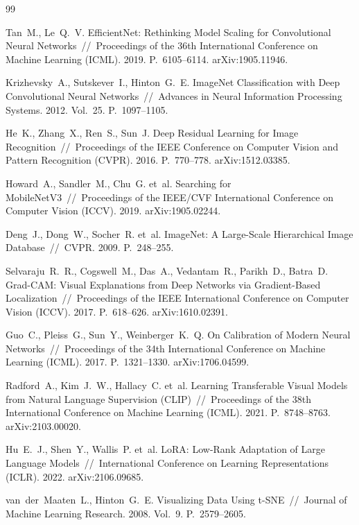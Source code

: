 \documentclass[a4paper,12pt]{diplom}
\begin{document}
\renewcommand{\bibname}{Список литературы}
\begin{thebibliography}{99}

Tan~M., Le~Q.~V. EfficientNet: Rethinking Model Scaling for Convolutional Neural Networks~//~Proceedings of the 36th International Conference on Machine Learning (ICML). 2019. P.~6105--6114. arXiv:1905.11946.

Krizhevsky~A., Sutskever~I., Hinton~G.~E. ImageNet Classification with Deep Convolutional Neural Networks~//~Advances in Neural Information Processing Systems. 2012. Vol.~25. P.~1097--1105.

He~K., Zhang~X., Ren~S., Sun~J. Deep Residual Learning for Image Recognition~//~Proceedings of the IEEE Conference on Computer Vision and Pattern Recognition (CVPR). 2016. P.~770--778. arXiv:1512.03385.

Howard~A., Sandler~M., Chu~G. et~al. Searching for MobileNetV3~//~Proceedings of the IEEE/CVF International Conference on Computer Vision (ICCV). 2019. arXiv:1905.02244.

Deng~J., Dong~W., Socher~R. et~al. ImageNet: A Large-Scale Hierarchical Image Database~//~CVPR. 2009. P.~248--255.

Selvaraju~R.~R., Cogswell~M., Das~A., Vedantam~R., Parikh~D., Batra~D. Grad-CAM: Visual Explanations from Deep Networks via Gradient-Based Localization~//~Proceedings of the IEEE International Conference on Computer Vision (ICCV). 2017. P.~618--626. arXiv:1610.02391.

Guo~C., Pleiss~G., Sun~Y., Weinberger~K.~Q. On Calibration of Modern Neural Networks~//~Proceedings of the 34th International Conference on Machine Learning (ICML). 2017. P.~1321--1330. arXiv:1706.04599.

Radford~A., Kim~J.~W., Hallacy~C. et~al. Learning Transferable Visual Models from Natural Language Supervision (CLIP)~//~Proceedings of the 38th International Conference on Machine Learning (ICML). 2021. P.~8748--8763. arXiv:2103.00020.

Hu~E.~J., Shen~Y., Wallis~P. et~al. LoRA: Low-Rank Adaptation of Large Language Models~//~International Conference on Learning Representations (ICLR). 2022. arXiv:2106.09685.

van~der~Maaten~L., Hinton~G.~E. Visualizing Data Using t-SNE~//~Journal of Machine Learning Research. 2008. Vol.~9. P.~2579--2605.


\end{thebibliography}
\end{document}
